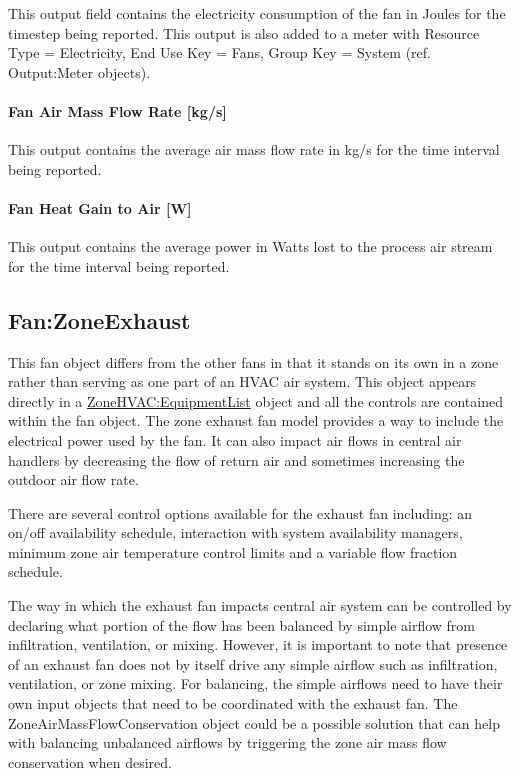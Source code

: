 This output field contains the electricity consumption of the fan in Joules for the timestep being reported. This output is also added to a meter with Resource Type = Electricity, End Use Key = Fans, Group Key = System (ref. Output:Meter objects).

\paragraph{Fan Air Mass Flow Rate {[}kg/s{]}}\label{fan-air-mass-flow-kgs-2}

This output contains the average air mass flow rate in kg/s for the time interval being reported.

\paragraph{Fan Heat Gain to Air {[}W{]}}\label{fan-heat-gain-to-air-w-2}

This output contains the average power in Watts lost to the process air stream for the time interval being reported.

\subsection{Fan:ZoneExhaust}\label{fanzoneexhaust}

This fan object differs from the other fans in that it stands on its own in a zone rather than serving as one part of an HVAC air system. This object appears directly in a \hyperref[zonehvacequipmentlist]{ZoneHVAC:EquipmentList} object and all the controls are contained within the fan object. The zone exhaust fan model provides a way to include the electrical power used by the fan. It can also impact air flows in central air handlers by decreasing the flow of return air and sometimes increasing the outdoor air flow rate.

There are several control options available for the exhaust fan including: an on/off availability schedule, interaction with system availability managers, minimum zone air temperature control limits and a variable flow fraction schedule.

The way in which the exhaust fan impacts central air system can be controlled by declaring what portion of the flow has been balanced by simple airflow from infiltration, ventilation, or mixing. However, it is important to note that presence of an exhaust fan does not by itself drive any simple airflow such as infiltration, ventilation, or zone mixing. For balancing, the simple airflows need to have their own input objects that need to be coordinated with the exhaust fan. The ZoneAirMassFlowConservation object could be a possible solution that can help with balancing unbalanced airflows by triggering the zone air mass flow conservation when desired.

